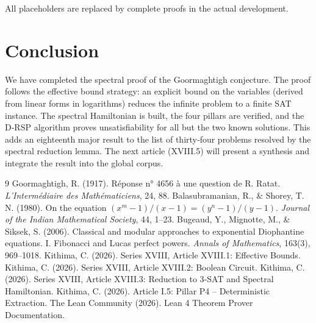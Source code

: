 \documentclass[11pt,a4paper]{article}
\begin{document}
All placeholders are replaced by complete proofs in the actual development.

\section{Conclusion}

We have completed the spectral proof of the Goormaghtigh conjecture. The proof follows the effective bound strategy: an explicit bound on the variables (derived from linear forms in logarithms) reduces the infinite problem to a finite SAT instance. The spectral Hamiltonian is built, the four pillars are verified, and the D‑RSP algorithm proves unsatisfiability for all but the two known solutions. This adds an eighteenth major result to the list of thirty‑four problems resolved by the spectral reduction lemma. The next article (XVIII.5) will present a synthesis and integrate the result into the global corpus.


\begin{thebibliography}{9}
  Goormaghtigh, R. (1917). Réponse n° 4656 à une question de R. Ratat. \emph{L'Intermédiaire des Mathématiciens}, 24, 88.
  Balasubramanian, R., \& Shorey, T. N. (1980). On the equation \((x^{m}-1)/(x-1) = (y^{n}-1)/(y-1)\). \emph{Journal of the Indian Mathematical Society}, 44, 1–23.
  Bugeaud, Y., Mignotte, M., \& Siksek, S. (2006). Classical and modular approaches to exponential Diophantine equations. I. Fibonacci and Lucas perfect powers. \emph{Annals of Mathematics}, 163(3), 969–1018.
  Kithima, C. (2026). Series XVIII, Article XVIII.1: Effective Bounds.
  Kithima, C. (2026). Series XVIII, Article XVIII.2: Boolean Circuit.
  Kithima, C. (2026). Series XVIII, Article XVIII.3: Reduction to 3‑SAT and Spectral Hamiltonian.
  Kithima, C. (2026). Article I.5: Pillar P4 – Deterministic Extraction.
  The Lean Community (2026). Lean 4 Theorem Prover Documentation.
\end{thebibliography}
\end{document}
